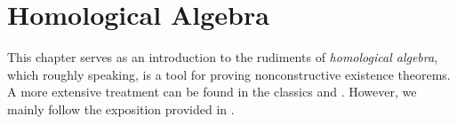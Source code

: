 \chapter{Homological Algebra}
This chapter serves as an introduction to the rudiments of \emph{homological algebra}, which roughly speaking, is a tool for proving nonconstructive existence theorems. A more extensive treatment can be found in the classics \cite{weibel:homological_algebra:1994} and \cite{rotman:homological_algebra:2009}. However, we mainly follow the exposition provided in \cite{grillet:abstract_algebra:2007}.












